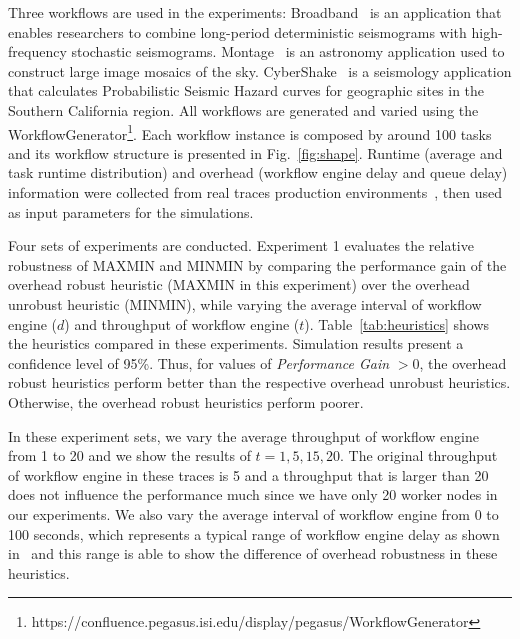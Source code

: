 \documentclass[final,5p,times,twocolumn]{elsarticle}
\begin{document}
Three workflows are used in the experiments: 
Broadband~\cite{Broadband} is an application that enables researchers to combine long-period deterministic seismograms with high-frequency stochastic seismograms. 
Montage~\cite{Sakellariou2010} is an astronomy application used to construct large image mosaics of the sky. CyberShake~\cite{Callaghan2008} is a seismology application that calculates Probabilistic Seismic Hazard curves for geographic sites in the Southern California region. All workflows are generated and varied using the WorkflowGenerator\footnote[1]{https://confluence.pegasus.isi.edu/display/pegasus/WorkflowGenerator}. Each workflow instance is composed by around 100 tasks and its workflow structure is presented in Fig.~\ref{fig:shape}. Runtime (average and task runtime distribution) and overhead (workflow engine delay and queue delay) information were collected from real traces production environments~\cite{Chen, Juve2013}, then used as input parameters for the simulations.




Four sets of experiments are conducted. Experiment 1 evaluates the relative robustness of MAXMIN and MINMIN by comparing the performance gain of the overhead robust heuristic (MAXMIN in this experiment) over the overhead unrobust heuristic (MINMIN), while varying the average interval of workflow engine ($d$) and throughput of workflow engine ($t$). Table~\ref{tab:heuristics} shows the heuristics compared in these experiments. Simulation results present a confidence level of 95\%. Thus, for values of \emph{Performance Gain} $> 0$, the overhead robust heuristics perform better than the respective overhead unrobust heuristics. Otherwise, the overhead robust heuristics perform poorer.




In these experiment sets, we vary the average throughput of workflow engine from 1 to 20 and we show the results of $t=1, 5, 15, 20$. The original throughput of workflow engine in these traces is 5 and a throughput that is larger than 20 does not influence the performance much since we have only 20 worker nodes in our experiments. We also vary the average interval of workflow engine from 0 to 100 seconds, which represents a typical range of workflow engine delay as shown in~\cite{Chen} and this range is able to show the difference of overhead robustness in these heuristics. 
\end{document}
